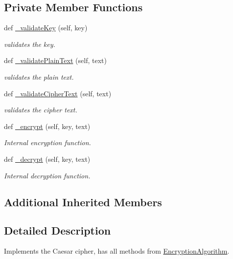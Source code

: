 \subsection*{Private Member Functions}
\begin{DoxyCompactItemize}
\item 
def \mbox{\hyperlink{classEncryptionAlgorithms_1_1CaesarCipher_af790e8acc754ab66e19652aaf003ef45}{\+\_\+validate\+Key}} (self, key)
\begin{DoxyCompactList}\small\item\em validates the key. \end{DoxyCompactList}\item 
def \mbox{\hyperlink{classEncryptionAlgorithms_1_1CaesarCipher_a6fe0acdce6b92624ba362c1b14a06e2b}{\+\_\+validate\+Plain\+Text}} (self, text)
\begin{DoxyCompactList}\small\item\em validates the plain text. \end{DoxyCompactList}\item 
def \mbox{\hyperlink{classEncryptionAlgorithms_1_1CaesarCipher_a55a7fb968fe4d734b8692271bba17c6b}{\+\_\+validate\+Cipher\+Text}} (self, text)
\begin{DoxyCompactList}\small\item\em validates the cipher text. \end{DoxyCompactList}\item 
def \mbox{\hyperlink{classEncryptionAlgorithms_1_1CaesarCipher_aa9613b0dd8ed0a3331a12ce3b607940b}{\+\_\+encrypt}} (self, key, text)
\begin{DoxyCompactList}\small\item\em Internal encryption function. \end{DoxyCompactList}\item 
def \mbox{\hyperlink{classEncryptionAlgorithms_1_1CaesarCipher_a26694e19444bbcb58987f24205cdbce7}{\+\_\+decrypt}} (self, key, text)
\begin{DoxyCompactList}\small\item\em Internal decryption function. \end{DoxyCompactList}\end{DoxyCompactItemize}
\subsection*{Additional Inherited Members}


\subsection{Detailed Description}
Implements the Caesar cipher, has all methods from \mbox{\hyperlink{classEncryptionAlgorithms_1_1EncryptionAlgorithm}{Encryption\+Algorithm}}. 

